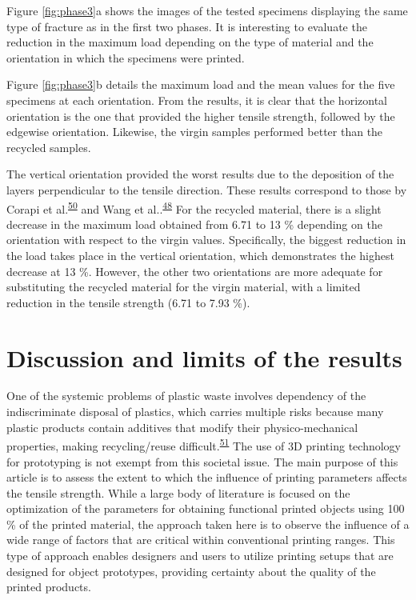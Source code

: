 \documentclass[
  12pt]{article}
\begin{document}
Figure \ref{fig:phase3}a shows the images of the tested specimens displaying the same type of fracture as in the first two phases.
It is interesting to evaluate the reduction in the maximum load depending on the type of material and the orientation in which the specimens were printed.

Figure \ref{fig:phase3}b details the maximum load and the mean values for the five specimens at each orientation.
From the results, it is clear that the horizontal orientation is the one that provided the higher tensile strength, followed by the edgewise orientation.
Likewise, the virgin samples performed better than the recycled samples.

The vertical orientation provided the worst results due to the deposition of the layers perpendicular to the tensile direction.
These results correspond to those by Corapi et al.\textsuperscript{\protect\hyperlink{ref-Corapi2019}{50}} and Wang et al..\textsuperscript{\protect\hyperlink{ref-Wang2020h}{48}}
For the recycled material, there is a slight decrease in the maximum load obtained from 6.71 to 13 \% depending on the orientation with respect to the virgin values. Specifically, the biggest reduction in the load takes place in the vertical orientation, which demonstrates the highest decrease at 13 \%.
However, the other two orientations are more adequate for substituting the recycled material for the virgin material, with a limited reduction in the tensile strength (6.71 to 7.93 \%).

\hypertarget{section:discussion}{%
\section{Discussion and limits of the results}\label{section:discussion}}

One of the systemic problems of plastic waste involves dependency of the indiscriminate disposal of plastics, which carries multiple risks because many plastic products contain additives that modify their physico-mechanical properties, making recycling/reuse difficult.\textsuperscript{\protect\hyperlink{ref-Wagner2020}{51}}
The use of 3D printing technology for prototyping is not exempt from this societal issue. The main purpose of this article is to assess the extent to which the influence of printing parameters affects the tensile strength.
While a large body of literature is focused on the optimization of the parameters for obtaining functional printed objects using 100 \% of the printed material, the approach taken here is to observe the influence of a wide range of factors that are critical within conventional printing ranges.
This type of approach enables designers and users to utilize printing setups that are designed for object prototypes, providing certainty about the quality of the printed products.
\end{document}

